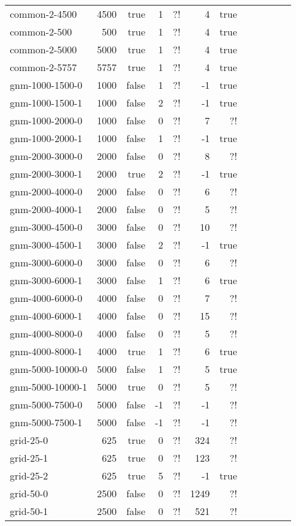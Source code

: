\documentclass{tufte-handout}
\begin{document}
\begin{longtable}{lrrrrrrrrrrr}
	common-2-4500 & 4500 & true & 1 & ?! & 4 & true\\
	common-2-500 & 500 & true & 1 & ?! & 4 & true\\
	common-2-5000 & 5000 & true & 1 & ?! & 4 & true\\
	common-2-5757 & 5757 & true & 1 & ?! & 4 & true\\
	gnm-1000-1500-0 & 1000 & false & 1 & ?! & -1 & true\\
	gnm-1000-1500-1 & 1000 & false & 2 & ?! & -1 & true\\
	gnm-1000-2000-0 & 1000 & false & 0 & ?! & 7 & ?!\\
	gnm-1000-2000-1 & 1000 & false & 1 & ?! & -1 & true\\
	gnm-2000-3000-0 & 2000 & false & 0 & ?! & 8 & ?!\\
	gnm-2000-3000-1 & 2000 & true & 2 & ?! & -1 & true\\
	gnm-2000-4000-0 & 2000 & false & 0 & ?! & 6 & ?!\\
	gnm-2000-4000-1 & 2000 & false & 0 & ?! & 5 & ?!\\
	gnm-3000-4500-0 & 3000 & false & 0 & ?! & 10 & ?!\\
	gnm-3000-4500-1 & 3000 & false & 2 & ?! & -1 & true\\
	gnm-3000-6000-0 & 3000 & false & 0 & ?! & 6 & ?!\\
	gnm-3000-6000-1 & 3000 & false & 1 & ?! & 6 & true\\
	gnm-4000-6000-0 & 4000 & false & 0 & ?! & 7 & ?!\\
	gnm-4000-6000-1 & 4000 & false & 0 & ?! & 15 & ?!\\
	gnm-4000-8000-0 & 4000 & false & 0 & ?! & 5 & ?!\\
	gnm-4000-8000-1 & 4000 & true & 1 & ?! & 6 & true\\
	gnm-5000-10000-0 & 5000 & false & 1 & ?! & 5 & true\\
	gnm-5000-10000-1 & 5000 & true & 0 & ?! & 5 & ?!\\
	gnm-5000-7500-0 & 5000 & false & -1 & ?! & -1 & ?!\\
	gnm-5000-7500-1 & 5000 & false & -1 & ?! & -1 & ?!\\
	grid-25-0 & 625 & true & 0 & ?! & 324 & ?!\\
	grid-25-1 & 625 & true & 0 & ?! & 123 & ?!\\
	grid-25-2 & 625 & true & 5 & ?! & -1 & true\\
	grid-50-0 & 2500 & false & 0 & ?! & 1249 & ?!\\
	grid-50-1 & 2500 & false & 0 & ?! & 521 & ?!\\

\end{longtable}
\end{document}
